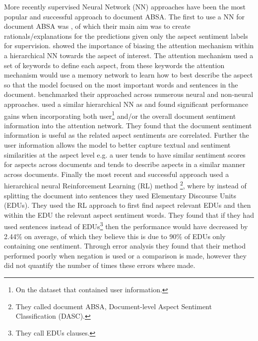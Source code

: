 More recently supervised Neural Network (NN) approaches have been the most popular and successful approach to document ABSA. The first to use a NN for document ABSA was \citet{lei-etal-2016-rationalizing}, of which their main aim was to create rationals/explanations for the predictions given only the aspect sentiment labels for supervision. \citet{yin-etal-2017-document} showed the importance of biasing the attention mechanism within a hierarchical NN \citep{yang-etal-2016-hierarchical} towards the aspect of interest. The attention mechanism used a set of keywords to define each aspect, from these keywords the attention mechanism would use a memory network \citep{weston2014memory} to learn how to best describe the aspect so that the model focused on the most important words and sentences in the document. \citet{yin-etal-2017-document} benchmarked their approached across numerous neural and non-neural approaches. \citet{li-etal-2018-document} used a similar hierarchical NN as \citet{yin-etal-2017-document} and found significant performance gains when incorporating both user\footnote{On the dataset that contained user information.} and/or the overall document sentiment information into the attention network. They found that the document sentiment information is useful as the related aspect sentiments are correlated. Further the user information allows the model to better capture textual and sentiment similarities at the aspect level e.g. a user tends to have similar sentiment scores for aspects across documents and tends to describe aspects in a similar manner across documents. Finally the most recent and successful approach used a hierarchical neural Reinforcement Learning (RL) \citep{williams1992simple} method \citep{wang-etal-2019-human}\footnote{They called document ABSA, Document-level Aspect Sentiment Classification (DASC).}, where by instead of splitting the document into sentences they used Elementary Discourse Units (EDUs). They used the RL approach to first find aspect relevant EDUs and then within the EDU the relevant aspect sentiment words. They found that if they had used sentences instead of EDUs\footnote{They call EDUs clauses.} then the performance would have decreased by 2.44\% on average, of which they believe this is due to 90\% of EDUs only containing one sentiment\citep{bayoudhi2015sentiment}. Through error analysis they found that their method performed poorly when negation is used or a comparison is made, however they did not quantify the number of times these errors where made.

